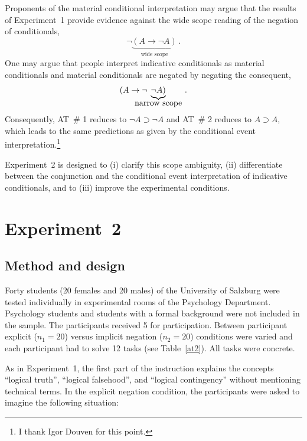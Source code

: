 \documentclass[11pt]{article}
\begin{document}
Proponents of the material conditional interpretation may argue that
the results of Experiment~1 provide evidence against the wide scope
reading of the negation of conditionals,
\[\neg \underbrace{(A\rightarrow \neg A)}_{\mbox{wide scope}}\, .\]
One may argue that people interpret indicative conditionals as
material conditionals and  material conditionals are negated by negating the consequent,
\[(A\rightarrow \neg \hspace{-.6cm}\underbrace{\neg A)}_{\mbox{narrow
    scope}}\, .\] Consequently, AT~\# 1 reduces to $\neg A\supset \neg
A$ and AT~\# 2 reduces to $A\supset A$, which leads to the same
predictions as given by the conditional event interpretation.\footnote{I thank
  Igor Douven for this point.}

Experiment~2 is designed to (i) clarify this scope ambiguity, (ii)
differentiate between the conjunction and the conditional event
interpretation of indicative conditionals, and to (iii) improve the
experimental conditions.




\section{Experiment~2}
\subsection{Method and design}
Forty students (20 females and 20 males) of the University of Salzburg
were tested individually in experimental rooms of the Psychology
Department. Psychology students and students with a formal background
were not included in the sample. The participants received 5 {\EUR}
for participation. Between participant explicit ($n_1=20$) versus implicit negation
($n_2=20$) conditions were varied and each participant had to solve 12
tasks (see Table~\ref{at2}). All tasks were concrete.


As in Experiment~1, the first part of the instruction explains the concepts
``logical truth'', ``logical falsehood'', and ``logical contingency''
without mentioning technical terms. In the explicit negation condition, the participants
were asked to imagine the following situation:
\end{document}
